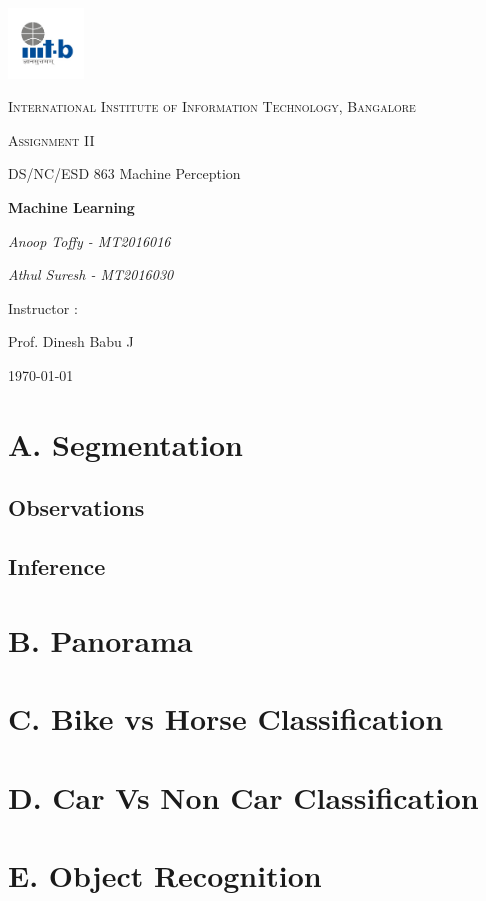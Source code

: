 \documentclass[11pt,a4paper]{article}
\begin{document}
\begin{titlepage}
	\centering
	\includegraphics[width=0.15\textwidth]{IIIT-B_logo.jpg}\par\vspace{1cm}
	{\scshape\LARGE International Institute of Information Technology, Bangalore \par}
	\vspace{1cm}
	{\scshape\Large Assignment II\par}
	{\Large DS/NC/ESD 863 Machine Perception\par}
	\vspace{1.5cm}
	{\huge\bfseries Machine Learning \par}
	\vspace{2cm}
	{\Large\itshape Anoop Toffy - MT2016016\par}
	{\Large\itshape Athul Suresh - MT2016030\par}
	\vfill
	Instructor : \par
	Prof. Dinesh Babu J 

	\vfill

	{\large \today\par}
\end{titlepage}


\tableofcontents
\listoffigures
\listoftables


\newpage

\section{A. Segmentation}


\subsection{Observations}


\subsection{Inference}


\newpage

\section{B. Panorama}

\newpage

\section{C. Bike vs Horse Classification}
\newpage

\section{D. Car Vs Non Car Classification}
\newpage

\section{E. Object Recognition
}
\end{document}

